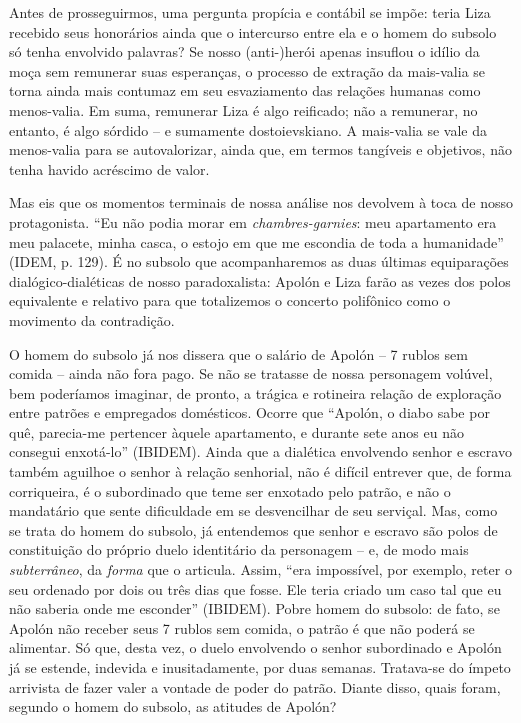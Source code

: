 Antes de prosseguirmos, uma pergunta propícia e contábil se impõe: teria
Liza recebido seus honorários ainda que o intercurso entre ela e o homem
do subsolo só tenha envolvido palavras? Se nosso (anti-)herói apenas
insuflou o idílio da moça sem remunerar suas esperanças, o processo de
extração da mais-valia se torna ainda mais contumaz em seu esvaziamento
das relações humanas como menos-valia. Em suma, remunerar Liza é algo
reificado; não a remunerar, no entanto, é algo sórdido -- e sumamente
dostoievskiano. A mais-valia se vale da menos-valia para se
autovalorizar, ainda que, em termos tangíveis e objetivos, não tenha
havido acréscimo de valor.

Mas eis que os momentos terminais de nossa análise nos devolvem à toca
de nosso protagonista. ``Eu não podia morar em \emph{chambres-garnies}:
meu apartamento era meu palacete, minha casca, o estojo em que me
escondia de toda a humanidade'' (IDEM, p. 129). É no subsolo que
acompanharemos as duas últimas equiparações dialógico-dialéticas de
nosso paradoxalista: Apolón e Liza farão as vezes dos polos equivalente
e relativo para que totalizemos o concerto polifônico como o movimento
da contradição.

O homem do subsolo já nos dissera que o salário de Apolón -- 7 rublos
sem comida -- ainda não fora pago. Se não se tratasse de nossa
personagem volúvel, bem poderíamos imaginar, de pronto, a trágica e
rotineira relação de exploração entre patrões e empregados domésticos.
Ocorre que ``Apolón, o diabo sabe por quê, parecia-me pertencer àquele
apartamento, e durante sete anos eu não consegui enxotá-lo'' (IBIDEM).
Ainda que a dialética envolvendo senhor e escravo também aguilhoe o
senhor à relação senhorial, não é difícil entrever que, de forma
corriqueira, é o subordinado que teme ser enxotado pelo patrão, e não o
mandatário que sente dificuldade em se desvencilhar de seu serviçal.
Mas, como se trata do homem do subsolo, já entendemos que senhor e
escravo são polos de constituição do próprio duelo identitário da
personagem -- e, de modo mais \emph{subterrâneo}, da \emph{forma} que o
articula. Assim, ``era impossível, por exemplo, reter o seu ordenado por
dois ou três dias que fosse. Ele teria criado um caso tal que eu não
saberia onde me esconder'' (IBIDEM). Pobre homem do subsolo: de fato, se
Apolón não receber seus 7 rublos sem comida, o patrão é que não poderá
se alimentar. Só que, desta vez, o duelo envolvendo o senhor subordinado
e Apolón já se estende, indevida e inusitadamente, por duas semanas.
Tratava-se do ímpeto arrivista de fazer valer a vontade de poder do
patrão. Diante disso, quais foram, segundo o homem do subsolo, as
atitudes de Apolón?

